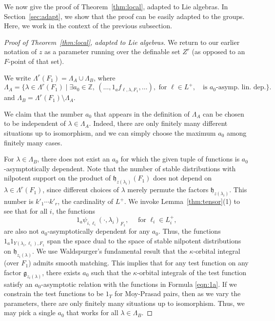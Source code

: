 \documentclass[12pt]{amsart}
\newcommand{\ring}[1]{{\mathbb #1}}
\def\Y{\Upsilon}
\newcommand{\fg}{\mathfrak{g}}
\newcommand{\fh}{\mathfrak{h}}
\theoremstyle{plain}
\theoremstyle{definition}
\begin{document}
We now give the proof of Theorem~\ref{thm:local}, adapted to Lie
algebras.  In Section~\ref{sec:adapt}, we show that the proof can be
easily adapted to the groups.  Here, we work in the context of the
previous subsection.

\begin{proof}[Proof of Theorem~\ref{thm:local}, adapted to Lie algebras]
We return to our earlier notation of $z$ as a
parameter running over the definable set $Z^r$ (as opposed to an $F$-point
of that set).

We write $\Lambda^r(F_1) = \Lambda_A \cup\Lambda_B$, where
\[
\Lambda_A = \{\lambda\in\Lambda^r(F_1)\mid
\exists a_0\in\ring{Z},\ (\ldots,1_af_{\ell,\lambda,F_1},\ldots), \text{ for } \ell\in L^+,
\quad\text{is } a_0\text{-asymp. lin. dep.} \}.
\]
and $\Lambda_B = \Lambda^r(F_1)\setminus \Lambda_A$.  

We claim that the number $a_0$ that appears in the definition of $\Lambda_A$
can be chosen to be independent of $\lambda\in\Lambda_A$.  Indeed,
there are only finitely many different situations up to isomorphism,
and we can simply choose the maximum $a_0$ among finitely many cases.

For $\lambda\in \Lambda_B$, there does not exist an $a_0$ for which
the given tuple of functions is $a_0$-asymptotically dependent.  Note
that the number of stable distributions with nilpotent support on the
product of $\fh_{z(\lambda_i)}(F_1)$ does not depend on $\lambda\in
\Lambda^r(F_1)$, since different choices of $\lambda$ merely permute
the factors $\fh_{z(\lambda_i)}$.  This number is $k'_1\cdots k'_r$,
the cardinality of $L^+$.  We invoke Lemma~\ref{thm:tensor}(1) to see
that for all $i$, the functions
\begin{equation}\label{eqn:1a}
1_a\psi_{i,\ell_i}(\cdot,\lambda_i)_{F_1},\quad \text{ for }\ell_i\in L^+_i,
\end{equation}
are also not $a_0$-asymptotically dependent for any $a_0$.  Thus, the
functions $1_a 1_{Y(\lambda_i,\ell_i),F_1}$ span the space dual to the
space of stable nilpotent distributions on $\fh_{z_i(\lambda)}$.  We
use Waldspurger's fundamental result \cite{waldspurger1997lemme} that
the $\kappa$-orbital integral (over $F_1$) admits smooth
matching. This implies that for any test function on any factor
$\fg_{z_i(\lambda)}$, there exists $a_0$ such that the
$\kappa$-orbital integrals of the test function satisfy an
$a_0$-asymptotic relation with the functions in Formula \ref{eqn:1a}.
If we constrain the test functions to be $1_\Y$ for Moy-Prasad pairs,
then as we vary the parameters, there are only finitely many
situations up to isomorphism.  Thus, we may pick a single $a_0$ that
works for all $\lambda\in\Lambda_B$.


\end{proof}
\end{document}
